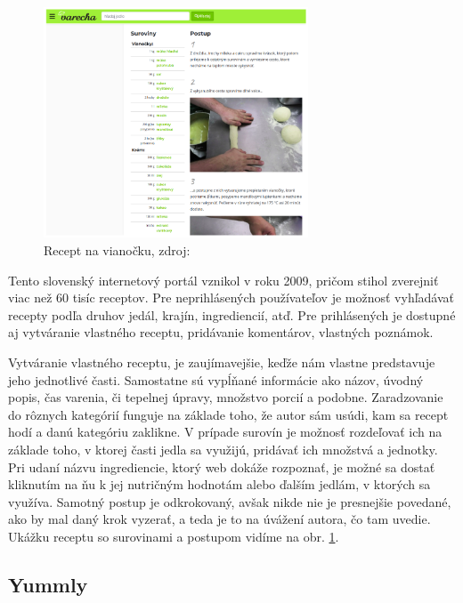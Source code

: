 {\begin{figure}[h]
\centering
\includegraphics[width=0.7\textwidth]{images/varecha}
\caption{Recept na vianočku, zdroj: \cite{varecha}}
\label{varecha}
\end{figure}

Tento slovenský internetový portál \cite{varecha} vznikol v roku 2009, pričom stihol zverejniť viac
než 60 tisíc receptov. Pre neprihlásených používateľov je možnosť vyhľadávať recepty
podľa druhov jedál, krajín, ingrediencií, atď. Pre prihlásených je dostupné aj vytváranie
vlastného receptu, pridávanie komentárov, vlastných poznámok.

Vytváranie vlastného receptu, je zaujímavejšie, keďže nám vlastne predstavuje jeho
jednotlivé časti. Samostatne sú vypĺňané informácie ako názov, úvodný popis, čas varenia, či tepelnej úpravy, množstvo porcií a podobne. Zaradzovanie do rôznych kategórií
funguje na základe toho, že autor sám usúdi, kam sa recept hodí a danú kategóriu
zaklikne. V prípade surovín je možnosť rozdeľovať ich na základe toho, v ktorej časti
jedla sa využijú, pridávať ich množstvá a jednotky. Pri udaní názvu ingrediencie, ktorý
web dokáže rozpoznať, je možné sa dostať kliknutím na ňu k jej nutričným hodnotám
alebo ďalším jedlám, v ktorých sa využíva. Samotný postup je odkrokovaný, avšak nikde nie je presnejšie povedané, ako by mal daný krok vyzerať, a teda je to na úvážení
autora, čo tam uvedie. Ukážku receptu so surovinami a postupom vidíme na obr. \ref{varecha}.

\subsection{Yummly}

}
